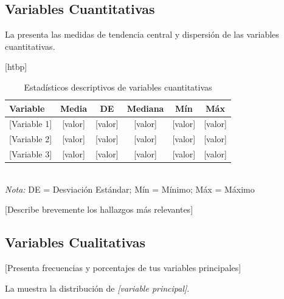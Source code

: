 \subsection{Variables Cuantitativas}
\label{subsec:variables_cuantitativas}

La  presenta las medidas de tendencia central y dispersión de las variables cuantitativas.

\begin{table}{[htbp]}
    \centering
    \caption{Estadísticos descriptivos de variables cuantitativas}
    \label{tab:descriptivos_cuantitativos}
    \begin{tabular}{@{}lccccc@{}}
        \toprule
        \textbf{Variable} & \textbf{Media} & \textbf{DE} & \textbf{Mediana} & \textbf{Mín} & \textbf{Máx} \\
        \midrule
        {{[Variable 1]}} & {{[valor]}} & {{[valor]}} & {{[valor]}} & {{[valor]}} & {{[valor]}} \\
        {{[Variable 2]}} & {{[valor]}} & {{[valor]}} & {{[valor]}} & {{[valor]}} & {{[valor]}} \\
        {{[Variable 3]}} & {{[valor]}} & {{[valor]}} & {{[valor]}} & {{[valor]}} & {{[valor]}} \\
        \bottomrule
    \end{tabular}
    \\[5pt]
    \footnotesize{\textit{Nota:} DE = Desviación Estándar; Mín = Mínimo; Máx = Máximo}
\end{table}

{[Describe brevemente los hallazgos más relevantes]}

\subsection{Variables Cualitativas}
\label{subsec:variables_cualitativas}

{[Presenta frecuencias y porcentajes de tus variables principales]}

La  muestra la distribución de \textit{{[variable principal]}}.



